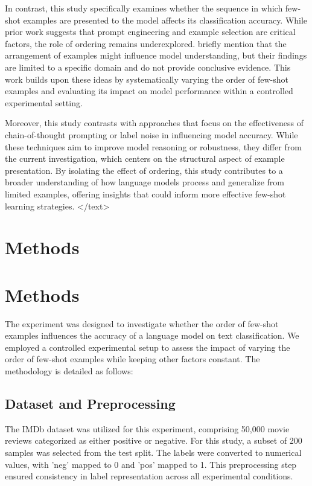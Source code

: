\documentclass{article}
\begin{document}
In contrast, this study specifically examines whether the sequence in which few-shot examples are presented to the model affects its classification accuracy. While prior work suggests that prompt engineering and example selection are critical factors, the role of ordering remains underexplored. \citet{wang2023ordering} briefly mention that the arrangement of examples might influence model understanding, but their findings are limited to a specific domain and do not provide conclusive evidence. This work builds upon these ideas by systematically varying the order of few-shot examples and evaluating its impact on model performance within a controlled experimental setting.

Moreover, this study contrasts with approaches that focus on the effectiveness of chain-of-thought prompting or label noise in influencing model accuracy. While these techniques aim to improve model reasoning or robustness, they differ from the current investigation, which centers on the structural aspect of example presentation. By isolating the effect of ordering, this study contributes to a broader understanding of how language models process and generalize from limited examples, offering insights that could inform more effective few-shot learning strategies.
</text>
\section{Methods}
\section{Methods}

The experiment was designed to investigate whether the order of few-shot examples influences the accuracy of a language model on text classification. We employed a controlled experimental setup to assess the impact of varying the order of few-shot examples while keeping other factors constant. The methodology is detailed as follows:

\subsection{Dataset and Preprocessing}

The IMDb dataset was utilized for this experiment, comprising 50,000 movie reviews categorized as either positive or negative. For this study, a subset of 200 samples was selected from the test split. The labels were converted to numerical values, with 'neg' mapped to 0 and 'pos' mapped to 1. This preprocessing step ensured consistency in label representation across all experimental conditions.
\end{document}
